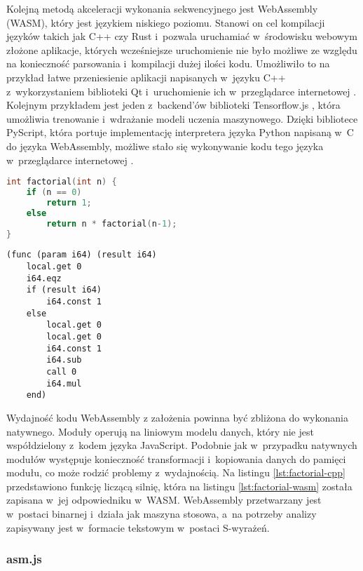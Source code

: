 Kolejną metodą akceleracji wykonania sekwencyjnego jest WebAssembly (WASM), który jest językiem niskiego poziomu. Stanowi on cel kompilacji języków takich jak C++ czy Rust i~pozwala uruchamiać w~środowisku webowym złożone aplikacje, których wcześniejsze uruchomienie nie było możliwe ze względu na konieczność parsowania i~kompilacji dużej ilości kodu. Umożliwiło to na przykład łatwe przeniesienie aplikacji napisanych w~języku C++ z~wykorzystaniem biblioteki Qt i~uruchomienie ich w~przeglądarce internetowej \cite{qt-wasm}. Kolejnym przykładem jest jeden z~backend'ów biblioteki Tensorflow.js \cite{tensorflowjs}, która umożliwia trenowanie i~wdrażanie modeli uczenia maszynowego. Dzięki bibliotece PyScript, która portuje implementację interpretera języka Python napisaną w~C do języka WebAssembly, możliwe stało się wykonywanie kodu tego języka w~przeglądarce internetowej \cite{pyscript}.

\begin{lstlisting}[language=C++, caption=Funkcja licząca silnię w~języku C/C++, label=lst:factorial-cpp]
int factorial(int n) {
    if (n == 0)
        return 1;
    else
        return n * factorial(n-1);
}
\end{lstlisting}
    
\begin{lstlisting}[language=WASM,float=ht, caption=Funkcja licząca silnię w~języku WASM, label=lst:factorial-wasm]
(func (param i64) (result i64)
    local.get 0
    i64.eqz
    if (result i64)
        i64.const 1
    else
        local.get 0
        local.get 0
        i64.const 1
        i64.sub
        call 0
        i64.mul
    end)
\end{lstlisting}

Wydajność kodu WebAssembly z założenia powinna być zbliżona do wykonania natywnego. Moduły operują na liniowym modelu danych, który nie jest współdzielony z~kodem języka JavaScript. Podobnie jak w~przypadku natywnych modułów występuje konieczność transformacji i~kopiowania danych do pamięci modułu, co może rodzić problemy z~wydajnością. Na listingu \ref{lst:factorial-cpp} przedstawiono funkcję liczącą silnię, która na listingu \ref{lst:factorial-wasm} została zapisana w~jej odpowiedniku w~WASM. WebAssembly przetwarzany jest w~postaci binarnej i~działa jak maszyna stosowa, a~na potrzeby analizy zapisywany jest w~formacie tekstowym w~postaci S-wyrażeń.

\subsubsection{asm.js}

